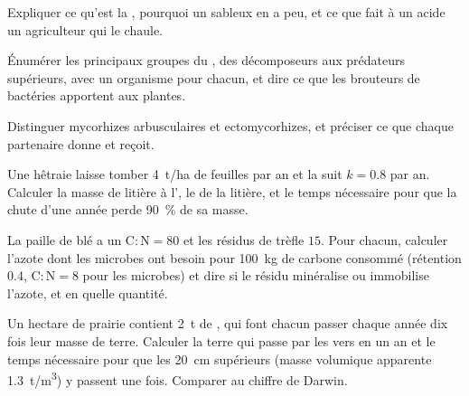 \begin{exercise}[$\star$]\label{exo:b2:living-soil:2}
Expliquer ce qu'est la , pourquoi un 
sableux en a peu, et ce que fait à un  acide un agriculteur qui le
chaule.
\end{exercise}

\begin{exercise}[$\star$]\label{exo:b2:living-soil:3}
Énumérer les principaux groupes du , des
décomposeurs aux prédateurs supérieurs, avec un organisme pour chacun, et
dire ce que les brouteurs de bactéries apportent aux plantes.
\end{exercise}

\begin{exercise}[$\star$]\label{exo:b2:living-soil:4}
Distinguer mycorhizes arbusculaires et ectomycorhizes, et préciser ce
que chaque partenaire donne et reçoit.
\end{exercise}

\begin{exercise}[$\star\star$]\label{exo:b2:living-soil:5}
Une hêtraie laisse tomber \qty{4}{t/ha} de feuilles par an et la
 suit $k = 0.8$ par an. Calculer la masse de litière à l', le  de la litière, et le temps nécessaire
pour que la chute d'une année perde \qty{90}{\%} de sa masse.
\end{exercise}

\begin{exercise}[$\star\star$]\label{exo:b2:living-soil:6}
La paille de blé a un $\mathrm{C:N} = 80$ et les résidus de trèfle $15$.
Pour chacun, calculer l'azote dont les microbes ont besoin pour
\qty{100}{kg} de carbone consommé (rétention 0.4, $\mathrm{C:N} = 8$ pour les
microbes) et dire si le résidu minéralise ou immobilise l'azote, et en quelle
quantité.
\end{exercise}

\begin{exercise}[$\star\star$]\label{exo:b2:living-soil:7}
Un hectare de prairie contient \qty{2}{t} de , qui font
chacun passer chaque année dix fois leur masse de terre. Calculer la
terre qui passe par les vers en un an et le temps nécessaire pour que les
\qty{20}{cm} supérieurs (masse volumique apparente \qty{1.3}{t/m^3}) y
passent une fois. Comparer au chiffre de Darwin.
\end{exercise}

